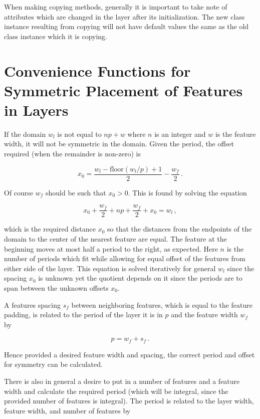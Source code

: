 \documentclass{article}
\begin{document}
When making copying methods, generally it is important to take note of attributes which are changed in the layer after its initialization. The new class instance resulting from copying will not have default values the same as the old class instance which it is copying.

\section{Convenience Functions for Symmetric Placement of Features in Layers}

If the domain $w_l$ is not equal to $np + w$ where $n$ is an integer and $w$ is the feature width, it will not be symmetric in the domain. Given the period, the offset required (when the remainder is non-zero) is 

$$x_0 = \frac{w_l - \text{floor}(w_l / p) + 1}{2} - \frac{w_f}{2}\,. $$

Of course $w_f$ should be such that $x_0 > 0$. This is found by solving the equation

$$x_0 + \frac{w_f}{2} + np + \frac{w_f}{2} + x_0 = w_l\,, $$

which is the required distance $x_0$ so that the distances from the endpoints of the domain to the center of the nearest feature are equal. The feature at the beginning moves at most half a period to the right, as expected. Here $n$ is the number of periods which fit while allowing for equal offset of the features from either side of the layer. This equation is solved iteratively for general $w_l$ since the spacing $x_0$ is unknown yet the quotient depends on it since the periods are to span between the unknown offsets $x_0$.


A features spacing $s_f$ between neighboring features, which is equal to the feature padding, is related to the period of the layer it is in $p$ and the feature width $w_f$ by

$$p = w_f + s_f \,.$$

Hence provided a desired feature width and spacing, the correct period and offset for symmetry can be calculated.

There is also in general a desire to put in a number of features and a feature width and calculate the required period (which will be integral, since the provided number of features is integral). The period is related to the layer width, feature width, and number of features by
\end{document}
